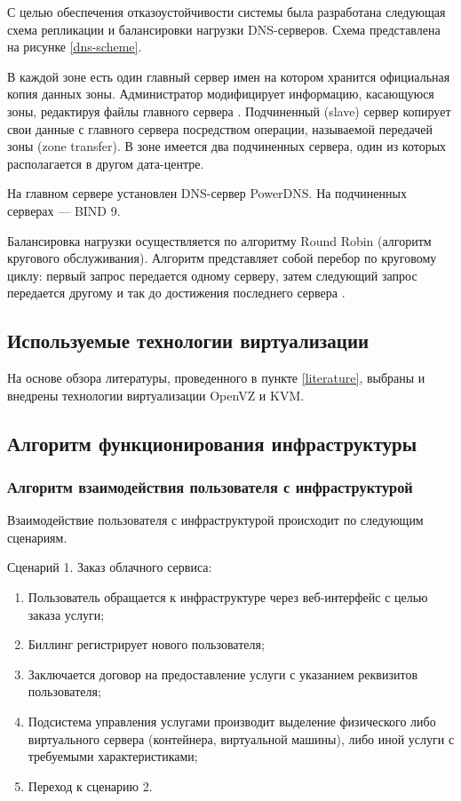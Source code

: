 С целью обеспечения отказоустойчивости системы была разработана следующая схема репликации и балансировки нагрузки DNS-серверов.
Схема представлена на рисунке \ref{dns-scheme}.

В каждой зоне есть один главный сервер имен на котором хранится официальная копия данных зоны.
Администратор модифицирует информацию, касающуюся зоны, редактируя файлы главного сервера \cite{unix-handbook}.
Подчиненный (slave) сервер копирует свои данные с главного сервера посредством операции, называемой передачей зоны (zone transfer).
В зоне имеется два подчиненных сервера, один из которых располагается в другом дата-центре.

На главном сервере установлен DNS-сервер PowerDNS.
На подчиненных серверах --- BIND 9.

Балансировка нагрузки осуществляется по алгоритму Round Robin (алгоритм кругового обслуживания).
Алгоритм представляет собой перебор по круговому циклу: первый запрос передается одному серверу, затем следующий запрос передается другому и так до достижения последнего сервера \cite{selectel}.

\subsection{Используемые технологии виртуализации}

На основе обзора литературы, проведенного в пункте \ref{literature}, выбраны и внедрены технологии виртуализации OpenVZ и KVM.

\subsection{Алгоритм функционирования инфраструктуры}

\subsubsection{Алгоритм взаимодействия пользователя с инфраструктурой}

Взаимодействие пользователя с инфраструктурой происходит по следующим сценариям.

Сценарий 1. Заказ облачного сервиса:
\begin{enumerate}
  \item Пользователь обращается к инфраструктуре через веб-интерфейс с целью заказа услуги;
  \item Биллинг регистрирует нового пользователя;
  \item Заключается договор на предоставление услуги с указанием реквизитов пользователя;
  \item Подсистема управления услугами производит выделение физического либо виртуального сервера (контейнера, виртуальной машины), либо иной услуги с требуемыми характеристиками;
  \item Переход к сценарию 2.
\end{enumerate}

